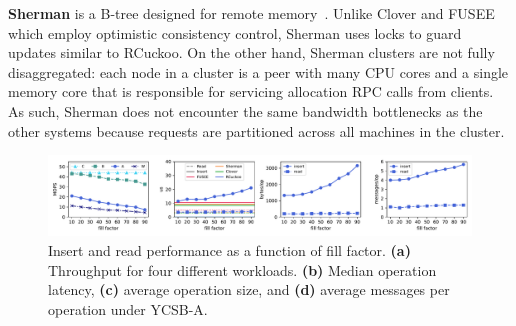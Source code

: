 \textbf{Sherman}
is a B-tree designed for remote memory~\cite{sherman}.
Unlike Clover and FUSEE which employ optimistic consistency control,
Sherman uses locks to guard updates similar to RCuckoo.  On the other
hand, Sherman clusters are not fully disaggregated: each node in a
cluster is a peer with many CPU cores and a single memory core
that is responsible for servicing allocation RPC calls from clients.
As such, Sherman does not encounter the same bandwidth bottlenecks as
the other systems because requests are partitioned across all
machines in the cluster.



\begin{figure}[ht]
    \includegraphics[width=0.99\linewidth]{fig/hero_ycsb_fill.pdf}

    \caption{Insert and read performance as a
    function of fill factor. \textbf{(a)} Throughput for four different workloads. \textbf{(b)}
    Median operation latency, \textbf{(c)} average operation size, and \textbf{(d)}
    average messages per operation under YCSB-A.}

    \label{fig:ycsb_fill}
\end{figure}




